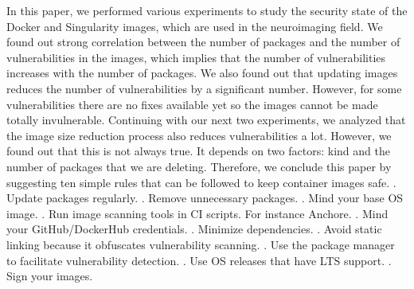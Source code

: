 \documentclass[a4paper,num-refs]{oup-contemporary}
\begin{document}
In this paper, we performed various experiments to study the security state of the Docker
and Singularity images, which are used in the neuroimaging field. We found out strong correlation
between the number of packages and the number of vulnerabilities in the images, which implies
that the number of vulnerabilities increases with the number of packages. We also found out that
updating images reduces the number of vulnerabilities by a significant number. However, for some
vulnerabilities there are no fixes available yet so the images cannot 
be made totally invulnerable. Continuing with our next two experiments, we analyzed that the
image size reduction process also reduces vulnerabilities a lot. However, we found out that this is not
always true. It depends on two factors: kind and the number of packages that we are
deleting. Therefore, we conclude this paper by suggesting ten simple rules that can be
followed to keep container images safe.
. Update packages regularly.
. Remove unnecessary packages.
. Mind your base OS image.
. Run image scanning tools in CI scripts. For instance Anchore.
. Mind your GitHub/DockerHub credentials.
. Minimize dependencies.
. Avoid static linking because it obfuscates vulnerability scanning.
. Use the package manager to facilitate vulnerability detection.
. Use OS releases that have LTS support.
. Sign your images.


\end{document}
